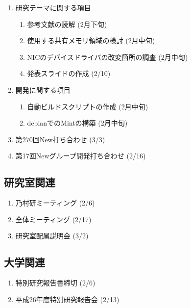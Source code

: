 \documentclass[fleqn, 14pt]{extarticle}
\begin{document}
\begin{enumerate}
\item 研究テーマに関する項目
\hfill
\begin{enumerate}


\item 参考文献の読解
\hfill
(2月下旬)

\item 使用する共有メモリ領域の検討
\hfill
(2月中旬)

\item NICのデバイスドライバの改変箇所の調査
\hfill
(2月中旬)

\item 発表スライドの作成 
\hfill
(2/10)

\end{enumerate}
\item 開発に関する項目
\hfill
\begin{enumerate}

\item 自動ビルドスクリプトの作成
\hfill
(2月中旬)

\item debianでのMintの構築
\hfill
(2月中旬)

\end{enumerate}
\item 第270回New打ち合わせ
\hfill
\label{enum-7}
(3/3)
\item 第17回Newグループ開発打ち合わせ
\hfill
\label{enum-8}
(2/16)
\end{enumerate}

\subsection{研究室関連}
\label{sec-4-2}

\begin{enumerate}


\item 乃村研ミーティング 
\hfill
\label{enum-16}
(2/6)

\item 全体ミーティング 
\hfill
\label{enum-18}
(2/17)

\item 研究室配属説明会 
\hfill
\label{enum-18}
(3/2)
\end{enumerate}

\subsection{大学関連}
\begin{enumerate}
\item 特別研究報告書締切 
\hfill
\label{enum-17}
(2/6)

\item 平成26年度特別研究報告会 
\hfill
\label{enum-17}
(2/13)


\end{enumerate}
\end{document}
